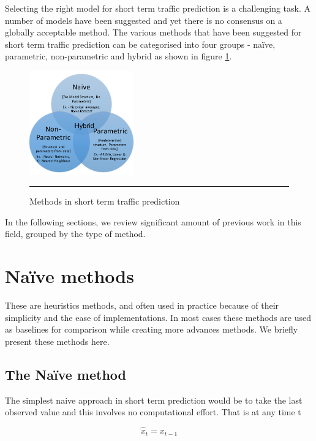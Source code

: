 Selecting the right model for short term traffic prediction is a challenging task. A number of
models have been suggested and yet there is no consensus on a globally acceptable method.
The various methods that have been suggested for short term traffic prediction can be categorised into four
groups - naïve, parametric, non-parametric and hybrid as shown in figure \ref{fig:sttp-methods}.

\begin{figure}[htbp]
  \centering
    \includegraphics[width=0.4\textwidth,height=0.4\textheight,keepaspectratio]{Figures/sttp-methods.pdf}
    \rule{35em}{0.5pt}
  \caption[Methods in short term traffic prediction]{Methods in short term traffic prediction}
  \label{fig:sttp-methods}
\end{figure}

In the following sections, we review significant amount of previous work in this field, grouped by the
type of method.

\section{Naïve methods}
These are heuristics methods, and often used in practice because of their simplicity and the ease
of implementations. In most cases these methods are used as baselines for comparison while
creating more advances methods. We briefly present these methods here.

\subsection{The Naïve method}
The simplest naive approach in short term prediction would be to take the last observed value and
this involves no computational effort. That is at any time t

        \begin{equation}
            \hat{x}_{t} = x_{t-1}
        \end{equation}

